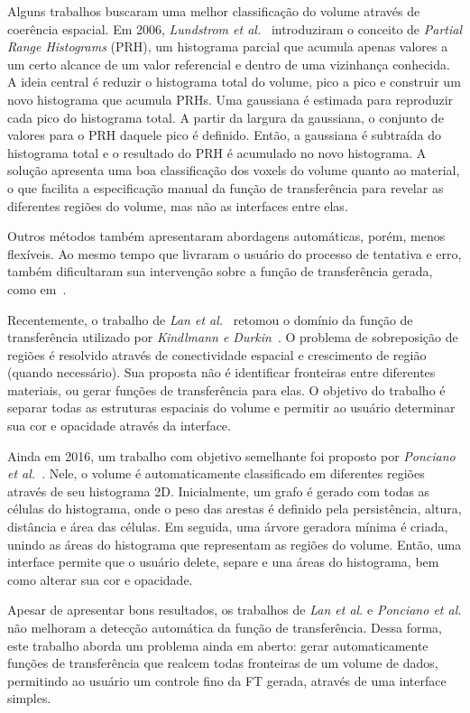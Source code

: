 	Alguns trabalhos buscaram uma melhor classificação do volume através de coerência espacial. Em 2006, \textit{Lundstrom et al.}~\cite{lundstrom1} introduziram o conceito de \textit{Partial Range Histograms} (PRH), um histograma parcial que acumula apenas valores a um certo alcance de um valor referencial e dentro de uma vizinhança conhecida. A ideia central é reduzir o histograma total do volume, pico a pico e construir um novo histograma que acumula PRHs. Uma gaussiana é estimada para reproduzir cada pico do histograma total. A partir da largura da gaussiana, o conjunto de valores para o PRH daquele pico é definido. Então, a gaussiana é subtraída do histograma total e o resultado do PRH é acumulado no novo histograma. A solução apresenta uma boa classificação dos voxels do volume quanto ao material, o que facilita a especificação manual da função de transferência para revelar as diferentes regiões do volume, mas não as interfaces entre elas.
	
	Outros métodos também apresentaram abordagens automáticas, porém, menos flexíveis. Ao mesmo tempo que livraram o usuário do processo de tentativa e erro, também dificultaram sua intervenção sobre a função de transferência gerada, como em~\cite{ruiz, zhou}.
	
	Recentemente, o trabalho de \textit{Lan et al.}~\cite{lan} retomou o domínio da função de transferência utilizado por \textit{Kindlmann e Durkin}~\cite{gordon}. O problema de sobreposição de regiões é resolvido através de conectividade espacial e crescimento de região (quando necessário). Sua proposta não é identificar fronteiras entre diferentes materiais, ou gerar funções de transferência para elas. O objetivo do trabalho é separar todas as estruturas espaciais do volume e permitir ao usuário determinar sua cor e opacidade através da interface.
	
	Ainda em 2016, um trabalho com objetivo semelhante foi proposto por \textit{Ponciano et al.}~\cite{marroquim}. Nele, o volume é automaticamente classificado em diferentes regiões através de seu histograma 2D. Inicialmente, um grafo é gerado com todas as células do histograma, onde o peso das arestas é definido pela persistência, altura, distância e área das células. Em seguida, uma árvore geradora mínima é criada, unindo as áreas do histograma que representam as regiões do volume. Então, uma interface permite que o usuário delete, separe e una áreas do histograma, bem como alterar sua cor e opacidade.
	
	Apesar de apresentar bons resultados, os trabalhos de \textit{Lan et al.} e \textit{Ponciano et al.} não melhoram a detecção automática da função de transferência. Dessa forma, este trabalho aborda um problema ainda em aberto: gerar automaticamente funções de transferência que realcem todas fronteiras de um volume de dados, permitindo ao usuário um controle fino da FT gerada, através de uma interface simples.